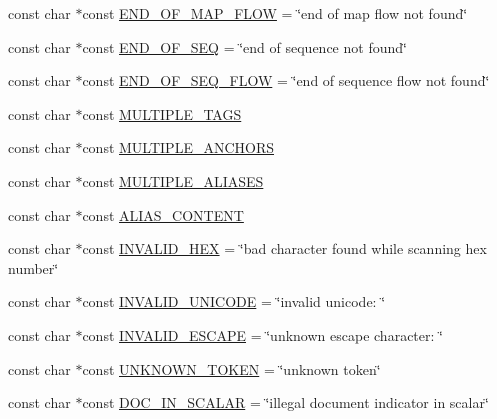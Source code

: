 \begin{DoxyCompactItemize}
\item 
const char $\ast$const \mbox{\hyperlink{namespace_y_a_m_l_1_1_error_msg_a296da05ac0955c7c78eaf08501bc0449}{E\+N\+D\+\_\+\+O\+F\+\_\+\+M\+A\+P\+\_\+\+F\+L\+OW}} = \char`\"{}end of map flow not found\char`\"{}
\item 
const char $\ast$const \mbox{\hyperlink{namespace_y_a_m_l_1_1_error_msg_a37dccab6e5fe5d99c00073cf4e540f3b}{E\+N\+D\+\_\+\+O\+F\+\_\+\+S\+EQ}} = \char`\"{}end of sequence not found\char`\"{}
\item 
const char $\ast$const \mbox{\hyperlink{namespace_y_a_m_l_1_1_error_msg_ac55b0ba7e0039779d3fcbc8e7f3617c0}{E\+N\+D\+\_\+\+O\+F\+\_\+\+S\+E\+Q\+\_\+\+F\+L\+OW}} = \char`\"{}end of sequence flow not found\char`\"{}
\item 
const char $\ast$const \mbox{\hyperlink{namespace_y_a_m_l_1_1_error_msg_aa1a47b9569e9de3811850c9ada6432a0}{M\+U\+L\+T\+I\+P\+L\+E\+\_\+\+T\+A\+GS}}
\item 
const char $\ast$const \mbox{\hyperlink{namespace_y_a_m_l_1_1_error_msg_a1ed54a792c452b16eaa920622ce205fb}{M\+U\+L\+T\+I\+P\+L\+E\+\_\+\+A\+N\+C\+H\+O\+RS}}
\item 
const char $\ast$const \mbox{\hyperlink{namespace_y_a_m_l_1_1_error_msg_a0eeb31be81acabf7f2a2c0086aa6ba99}{M\+U\+L\+T\+I\+P\+L\+E\+\_\+\+A\+L\+I\+A\+S\+ES}}
\item 
const char $\ast$const \mbox{\hyperlink{namespace_y_a_m_l_1_1_error_msg_ac547f96b85b206b119347992e859579e}{A\+L\+I\+A\+S\+\_\+\+C\+O\+N\+T\+E\+NT}}
\item 
const char $\ast$const \mbox{\hyperlink{namespace_y_a_m_l_1_1_error_msg_a76ec50a16fe3a922dba275e30473f323}{I\+N\+V\+A\+L\+I\+D\+\_\+\+H\+EX}} = \char`\"{}bad character found while scanning hex number\char`\"{}
\item 
const char $\ast$const \mbox{\hyperlink{namespace_y_a_m_l_1_1_error_msg_a7d6b41ffeb421ff626a13599b331a957}{I\+N\+V\+A\+L\+I\+D\+\_\+\+U\+N\+I\+C\+O\+DE}} = \char`\"{}invalid unicode\+: \char`\"{}
\item 
const char $\ast$const \mbox{\hyperlink{namespace_y_a_m_l_1_1_error_msg_a8bc9a3fadf1061dcd05b3ff20246bc90}{I\+N\+V\+A\+L\+I\+D\+\_\+\+E\+S\+C\+A\+PE}} = \char`\"{}unknown escape character\+: \char`\"{}
\item 
const char $\ast$const \mbox{\hyperlink{namespace_y_a_m_l_1_1_error_msg_a47cb8f44a985382ee5ef00a3e798bdd9}{U\+N\+K\+N\+O\+W\+N\+\_\+\+T\+O\+K\+EN}} = \char`\"{}unknown token\char`\"{}
\item 
const char $\ast$const \mbox{\hyperlink{namespace_y_a_m_l_1_1_error_msg_aa443defd689a9a069efdd44392253d13}{D\+O\+C\+\_\+\+I\+N\+\_\+\+S\+C\+A\+L\+AR}} = \char`\"{}illegal document indicator in scalar\char`\"{}

\end{DoxyCompactItemize}
